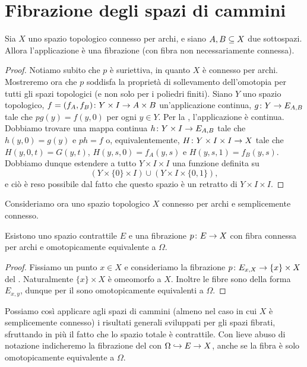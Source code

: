 \section{Fibrazione degli spazi di cammini}
\begin{theorem}
Sia \(X\) uno spazio topologico connesso per archi, e siano \(A,B\subseteq X\) due sottospazi. Allora l'applicazione
è una fibrazione (con fibra non necessariamente connessa).
\end{theorem}
\begin{proof}
Notiamo subito che \(p\) è suriettiva, in quanto \(X\) è connesso per archi. Mostreremo ora che \(p\) soddisfa la proprietà di sollevamento dell'omotopia per tutti gli spazi topologici (e non solo per i poliedri finiti). Siano \(Y\) uno spazio topologico, \(\map{f=(f_A,f_B)}{Y\times I}{A\times B}\) un'applicazione continua, \(\map{g}{Y}{E_{A,B}}\) tale che \(pg(y)=f(y,0)\) per ogni \(y\in Y\). Per la , l'applicazione
è continua. Dobbiamo trovare una mappa continua \(\map{h}{Y\times I}{E_{A,B}}\) tale che \(h(y,0)=g(y)\) e \(ph=f\) o, equivalentemente, \(\map{H}{Y\times I\times I}{X}\) tale che \(H(y,0,t)=G(y,t)\), \(H(y,s,0)=f_A(y,s)\) e \(H(y,s,1)=f_B(y,s)\). Dobbiamo dunque estendere a tutto \(Y\times I\times I\) una funzione definita su
\[
(Y\times\{0\}\times I)\cup(Y\times I\times \{0,1\}),
\]
e ciò è reso possibile dal fatto che questo spazio è un retratto di \(Y\times I\times I\).
\end{proof}

Consideriamo ora uno spazio topologico \(X\) connesso per archi e semplicemente connesso.

\begin{corollary}
Esistono uno spazio contrattile \(E\) e una fibrazione \(\map{p}{E}{X}\) con fibra connessa per archi e omotopicamente equivalente a \(\Omega\).
\end{corollary}
\begin{proof}
Fissiamo un punto \(x\in X\) e consideriamo la fibrazione \(\map{p}{E_{x,X}}{\{x\}\times X}\) del . Naturalmente \(\{x\}\times X\) è omeomorfo a \(X\). Inoltre le fibre sono della forma \(E_{x,y}\), dunque per il  sono omotopicamente equivalenti a \(\Omega\).
\end{proof}

Possiamo così applicare agli spazi di cammini (almeno nel caso in cui \(X\) è semplicemente connesso) i risultati generali sviluppati per gli spazi fibrati, sfruttando in più il fatto che lo spazio totale è contrattile. Con lieve abuso di notazione indicheremo la fibrazione del  con \(\Omega\hookrightarrow E\to X\), anche se la fibra è solo omotopicamente equivalente a \(\Omega\).

